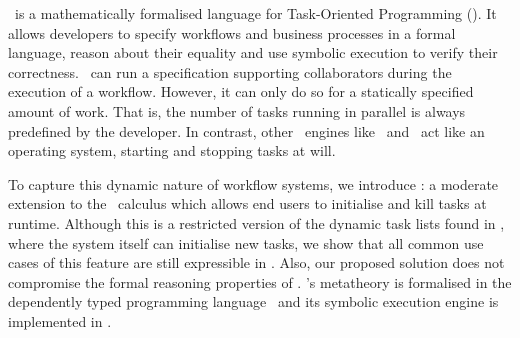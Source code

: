 %
%
\TOPHAT\ is a mathematically formalised language for Task-Oriented Programming (\TOP).
It allows developers to specify workflows and business processes in a formal language,
reason about their equality
and use symbolic execution to verify their correctness.
\TOPHAT\ can run a specification supporting collaborators during the execution of a workflow.
However, it can only do so for a statically specified amount of work.
That is, the number of tasks running in parallel is always predefined by the developer.
In contrast, other \TOP\ engines like \ITASKS\ and \MTASKS\ act like an operating system,
starting and stopping tasks at will.

To capture this dynamic nature of workflow systems,
we introduce \DYNTOPHAT:
a moderate extension to the \TOPHAT\ calculus which allows end users to initialise and kill tasks at runtime.
Although this is a restricted version of the dynamic task lists found in \ITASKS,
where the system itself can initialise new tasks,
we show that all common use cases of this feature are still expressible in \DYNTOPHAT.
Also, our proposed solution does not compromise the formal reasoning properties of \TOPHAT.
\TOPHAT's metatheory is formalised in the dependently typed programming language \IDRIS\
and its symbolic execution engine is implemented in \HASKELL.


